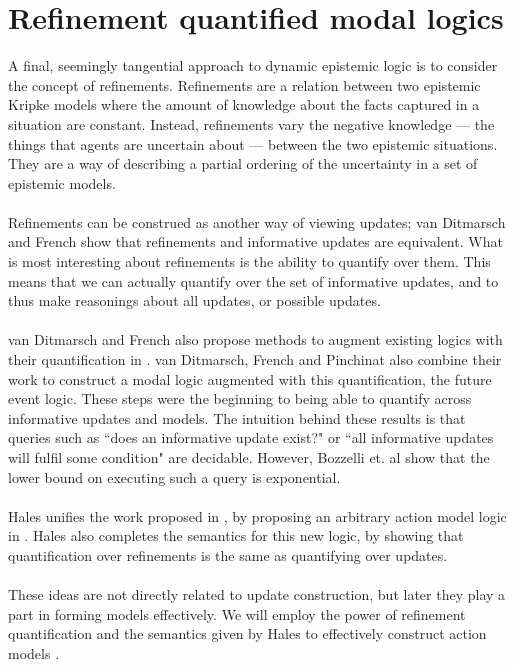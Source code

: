 \section{Refinement quantified modal logics} \label{section:refineModalLogics}

A final, seemingly tangential approach to dynamic epistemic logic is to consider the concept of refinements.
Refinements are a relation between two epistemic Kripke models where the amount of knowledge about
the facts captured in a situation are constant.
Instead, refinements vary the negative knowledge --- the things that agents are uncertain about ---
between the two epistemic situations.
They are a way of describing a partial ordering of the uncertainty in a set of epistemic models.\\
\\
Refinements can be construed as another way of viewing updates; van Ditmarsch and French \cite{van2009simulation} show
that refinements and informative updates are equivalent.
What is most interesting about refinements is the ability to quantify over them.
This means that we can actually quantify over the set of informative updates, and to thus make
reasonings about all updates, or possible updates.\\
\\
van Ditmarsch and French also propose methods to augment existing logics with their quantification
in \cite{van2009simulation}.
van Ditmarsch, French and Pinchinat \cite{van2010future} also combine their work to construct a modal logic augmented
with this quantification, the future event logic.
These steps were the beginning to being able to quantify across informative updates and models.
The intuition behind these results is that queries such as ``does an informative update exist?" or
``all informative updates will fulfil some condition" are decidable.
However, Bozzelli et. al \cite{refineModalComplexity} show that the lower bound on executing such a query is exponential. \\
\\
Hales unifies the work proposed in \cite{van2009simulation}, by proposing an arbitrary action model
logic in \cite{hales13synthesis}.
Hales also completes the semantics for this new logic, by showing that quantification over
refinements is the same as quantifying over updates.\\
\\
These ideas are not directly related to update construction, but later they play a part in forming
models effectively.
We will employ the power of refinement quantification and the semantics given by Hales to
effectively construct action models \cite{hales13synthesis}.

